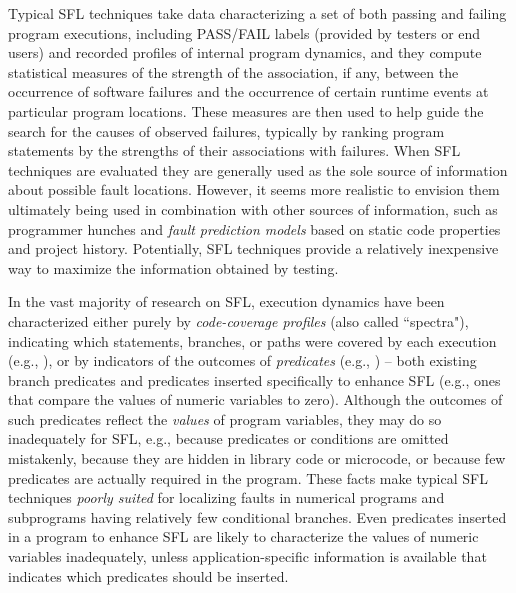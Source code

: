 Typical SFL techniques take data characterizing a set of both passing and failing program executions, including PASS/FAIL labels (provided by testers or end users) and recorded profiles of internal program dynamics, and they compute statistical measures of the strength of the association, if any, between the occurrence of software failures and the occurrence of certain runtime events at particular program locations.  These measures are then used to help guide the search for the causes of observed failures, typically by ranking program statements by the strengths of their associations with failures.  When SFL techniques are evaluated they are generally used as the sole source of information about possible fault locations.  However, it seems more realistic to envision them ultimately being used in combination with other sources of information, such as programmer hunches and {\it fault prediction models} \cite{Fenton1999} based on static code properties and project history.  Potentially, SFL techniques provide a relatively inexpensive way to maximize the information obtained by testing.

 In the vast majority of research on SFL, execution dynamics have been characterized either purely by {\it code-coverage profiles} (also called ``spectra"), indicating which statements, branches, or paths were covered by each execution (e.g., \cite{Jones2002}), or by indicators of the outcomes of {\it predicates} (e.g., \cite{Liblit2004}) – both existing branch predicates and predicates inserted specifically to enhance SFL (e.g., ones that compare the values of numeric variables to zero).  Although the outcomes of such predicates reflect the {\it values} of program variables, they may do so inadequately for SFL, e.g., because predicates or conditions are omitted mistakenly, because they are hidden in library code or microcode, or because few predicates are actually required in the program.  These facts make typical SFL techniques {\it poorly suited} for localizing faults in numerical programs and subprograms having relatively few conditional branches.  Even predicates inserted in a program to enhance SFL are likely to characterize the values of numeric variables inadequately, unless application-specific information is available that indicates which predicates should be inserted.

